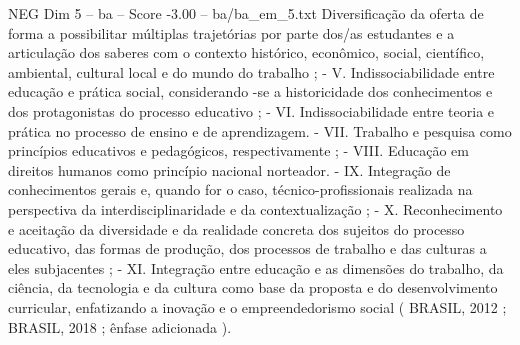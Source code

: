 \begin{textsample}{NEG Dim 5 – ba – Score -3.00 – ba/ba\_em\_5.txt}
Diversificação da oferta de forma a possibilitar múltiplas trajetórias por parte dos/as estudantes e a articulação dos saberes com o contexto histórico, econômico, social, científico, ambiental, cultural local e do mundo do trabalho ; - V.
Indissociabilidade entre educação e prática social, considerando -se a historicidade dos conhecimentos e dos protagonistas do processo educativo ; - VI.
Indissociabilidade entre teoria e prática no processo de ensino e de aprendizagem. - VII.
Trabalho e pesquisa como princípios educativos e pedagógicos, respectivamente ; - VIII.
Educação em direitos humanos como princípio nacional norteador. - IX.
Integração de conhecimentos gerais e, quando for o caso, técnico-profissionais realizada na perspectiva da interdisciplinaridade e da contextualização ; - X.
Reconhecimento e aceitação da diversidade e da realidade concreta dos sujeitos do processo educativo, das formas de produção, dos processos de trabalho e das culturas a eles subjacentes ; - XI.
Integração entre educação e as dimensões do trabalho, da ciência, da tecnologia e da cultura como base da proposta e do desenvolvimento curricular, enfatizando a inovação e o empreendedorismo social ( BRASIL, 2012 ; BRASIL, 2018 ; ênfase adicionada ).

\end{textsample}
